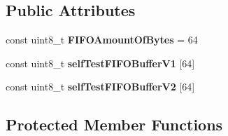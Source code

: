 \subsection*{Public Attributes}
\begin{DoxyCompactItemize}
\item 
\mbox{\label{class_m_f_r_c522_a56c8309a003cf1a5d8479c7783826f8e}} 
const uint8\+\_\+t {\bfseries F\+I\+F\+O\+Amount\+Of\+Bytes} = 64
\item 
const uint8\+\_\+t {\bfseries self\+Test\+F\+I\+F\+O\+Buffer\+V1} \mbox{[}64\mbox{]}
\item 
const uint8\+\_\+t {\bfseries self\+Test\+F\+I\+F\+O\+Buffer\+V2} \mbox{[}64\mbox{]}
\end{DoxyCompactItemize}
\subsection*{Protected Member Functions}
